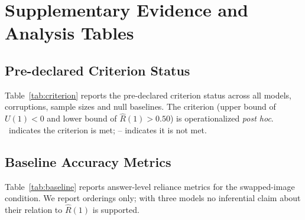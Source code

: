 \section{Supplementary Evidence and Analysis Tables}
\label{sec:appendix}

\subsection{Pre-declared Criterion Status}

Table~\ref{tab:criterion} reports the pre-declared criterion status across
all models, corruptions, sample sizes and null baselines. The criterion
(upper bound of $U(1)<0$ and lower bound of $\hat{R}(1)>0.50$) is
operationalized \emph{post hoc}. \checkmark\ indicates the criterion is met;
-- indicates it is not met.


\subsection{Baseline Accuracy Metrics}

Table~\ref{tab:baseline} reports answer-level reliance metrics for the
swapped-image condition. We report orderings only; with three models no
inferential claim about their relation to $\hat{R}(1)$ is supported.

